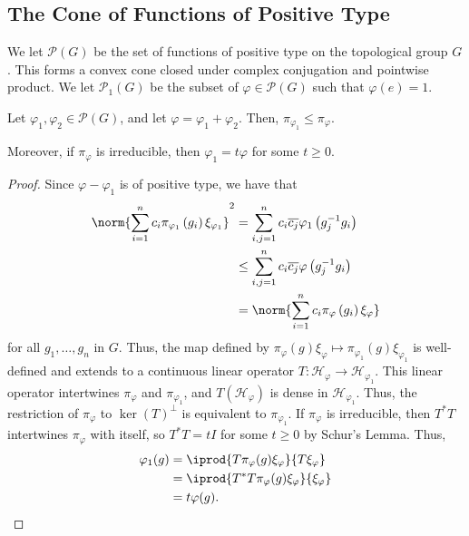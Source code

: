 \documentclass[10pt]{mypackage}
\begin{document}
\subsection{The Cone of Functions of Positive Type}%
We let $\mathcal{P}(G)$ be the set of functions of positive type on the topological group $G$. This forms a convex cone closed under complex conjugation and pointwise product. We let $ \mathcal{P}_1(G) $ be the subset of $\varphi\in \mathcal{P}(G)$ such that $\varphi(e) = 1$.
\begin{proposition}
  Let $\varphi_1,\varphi_2\in \mathcal{P}(G)$, and let $\varphi = \varphi_1 + \varphi_2$. Then, $\pi_{\varphi_1}\leq \pi_{\varphi}$.

  Moreover, if $\pi_{\varphi}$ is irreducible, then $\varphi_1 = t\varphi$ for some $t\geq 0$.
\end{proposition}
\begin{proof}
  Since $\varphi - \varphi_1$ is of positive type, we have that
  \begin{align*}
    \norm{\sum_{i=1}^{n}c_i\pi_{\varphi_1}\left( g_i \right)\xi_{\varphi_1}}^2 &= \sum_{i,j=1}^{n}c_i \overline{c_j} \varphi_1\left( g_j^{-1}g_i \right)\\
                                                                               &\leq \sum_{i,j=1}^{n} c_i \overline{c_j}\varphi\left( g_j^{-1}g_i \right)\\
                                                                               &= \norm{\sum_{i=1}^{n}c_i \pi_{\varphi}\left( g_i \right)\xi_{\varphi}}
  \end{align*}
  for all $g_1,\dots,g_n$ in $G$. Thus, the map defined by $\pi_{\varphi}\left( g \right)\xi_{\varphi}\mapsto \pi_{\varphi_1}\left( g \right)\xi_{\varphi_1}$ is well-defined and extends to a continuous linear operator $T\colon \mathscr{H}_{\varphi}\to \mathscr{H}_{\varphi_1}$. This linear operator intertwines $\pi_{\varphi}$ and $\pi_{\varphi_1}$, and $T\left( \mathscr{H}_{\varphi} \right)$ is dense in $ \mathscr{H}_{\varphi_1} $. Thus, the restriction of $\pi_{\varphi}$ to $\ker\left( T \right)^{\perp}$ is equivalent to $\pi_{\varphi_1}$. If $\pi_{\varphi}$ is irreducible, then $T^{\ast}T$ intertwines $\pi_{\varphi}$ with itself, so $T^{\ast}T = tI$ for some $t\geq 0$ by Schur's Lemma. Thus,
  \begin{align*}
    \varphi_1(g) &= \iprod{T\pi_{\varphi}(g)\xi_{\varphi}}{T\xi_{\varphi}}\\
                 &= \iprod{T^{\ast}T\pi_{\varphi}(g)\xi_{\varphi}}{\xi_{\varphi}}\\
                 &= t\varphi(g).
  \end{align*}
\end{proof}
\end{document}
